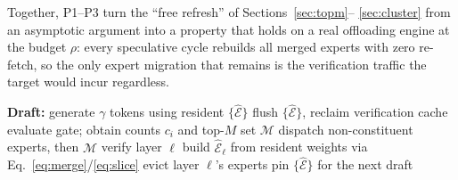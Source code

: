 Together, P1--P3 turn the ``free refresh'' of Sections~\ref{sec:topm}--%
\ref{sec:cluster} from an asymptotic argument into a property that holds on a real
offloading engine at the budget $\rho$: every speculative cycle rebuilds all
merged experts with zero re-fetch, so the only expert migration that remains is
the verification traffic the target would incur regardless.

\begin{algorithm}[t]
\caption{One speculative cycle with memory-bounded refresh (P1--P3)}
\label{alg:verify-merge}
\begin{algorithmic}[1]
\State \textbf{Draft:} generate $\gamma$ tokens using resident
       $\{\widehat{\mathcal{E}}\}$ 
\State flush $\{\widehat{\mathcal{E}}\}$, reclaim verification cache 
  \State evaluate gate; obtain counts $c_i$ and top-$M$ set $\mathcal{M}$
  \State dispatch non-constituent experts, then $\mathcal{M}$ 
  \State verify layer $\ell$
  \State build $\widehat{\mathcal{E}}_\ell$ from resident weights via
         Eq.~\eqref{eq:merge}/\eqref{eq:slice} 
  \State evict layer $\ell$'s experts 
\EndFor
\State pin $\{\widehat{\mathcal{E}}\}$ for the next draft 
\end{algorithmic}
\end{algorithm}
